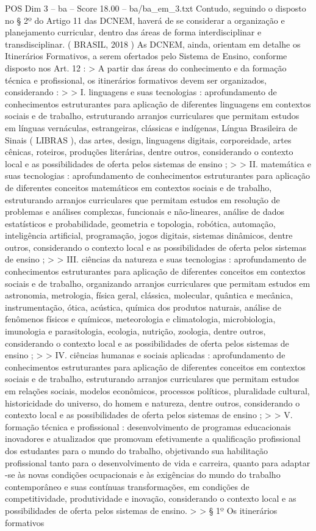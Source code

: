 \begin{textsample}{POS Dim 3 – ba – Score 18.00 – ba/ba\_em\_3.txt}
Contudo, seguindo o disposto no § 2º do Artigo 11 das DCNEM, haverá de se considerar a organização e planejamento curricular, dentro das áreas de forma interdisciplinar e transdisciplinar. ( BRASIL, 2018 ) As DCNEM, ainda, orientam em detalhe os Itinerários Formativos, a serem ofertados pelo Sistema de Ensino, conforme disposto nos Art. 12 : > A partir das áreas do conhecimento e da formação técnica e profissional, os itinerários formativos devem ser organizados, considerando : > > I. linguagens e suas tecnologias : aprofundamento de conhecimentos estruturantes para aplicação de diferentes linguagens em contextos sociais e de trabalho, estruturando arranjos curriculares que permitam estudos em línguas vernáculas, estrangeiras, clássicas e indígenas, Língua Brasileira de Sinais ( LIBRAS ), das artes, design, linguagens digitais, corporeidade, artes cênicas, roteiros, produções literárias, dentre outros, considerando o contexto local e as possibilidades de oferta pelos sistemas de ensino ; > > II. matemática e suas tecnologias : aprofundamento de conhecimentos estruturantes para aplicação de diferentes conceitos matemáticos em contextos sociais e de trabalho, estruturando arranjos curriculares que permitam estudos em resolução de problemas e análises complexas, funcionais e não-lineares, análise de dados estatísticos e probabilidade, geometria e topologia, robótica, automação, inteligência artificial, programação, jogos digitais, sistemas dinâmicos, dentre outros, considerando o contexto local e as possibilidades de oferta pelos sistemas de ensino ; > > III. ciências da natureza e suas tecnologias : aprofundamento de conhecimentos estruturantes para aplicação de diferentes conceitos em contextos sociais e de trabalho, organizando arranjos curriculares que permitam estudos em astronomia, metrologia, física geral, clássica, molecular, quântica e mecânica, instrumentação, ótica, acústica, química dos produtos naturais, análise de fenômenos físicos e químicos, meteorologia e climatologia, microbiologia, imunologia e parasitologia, ecologia, nutrição, zoologia, dentre outros, considerando o contexto local e as possibilidades de oferta pelos sistemas de ensino ; > > IV. ciências humanas e sociais aplicadas : aprofundamento de conhecimentos estruturantes para aplicação de diferentes conceitos em contextos sociais e de trabalho, estruturando arranjos curriculares que permitam estudos em relações sociais, modelos econômicos, processos políticos, pluralidade cultural, historicidade do universo, do homem e natureza, dentre outros, considerando o contexto local e as possibilidades de oferta pelos sistemas de ensino ; > > V. formação técnica e profissional : desenvolvimento de programas educacionais inovadores e atualizados que promovam efetivamente a qualificação profissional dos estudantes para o mundo do trabalho, objetivando sua habilitação profissional tanto para o desenvolvimento de vida e carreira, quanto para adaptar -se às novas condições ocupacionais e às exigências do mundo do trabalho contemporâneo e suas contínuas transformações, em condições de competitividade, produtividade e inovação, considerando o contexto local e as possibilidades de oferta pelos sistemas de ensino. > > § 1º Os itinerários formativos 
\end{textsample}
